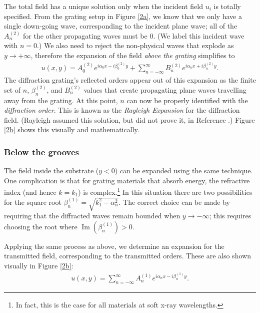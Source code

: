 The total field has a unique solution only when the incident field $u_i$ is totally specified.  From the grating setup in Figure \ref{2a}, we know that we only have a single down-going wave, corresponding to the incident plane wave; all of the $A^{(2)}_n$ for the other propagating waves must be 0.  (We label this incident wave with $n=0$.)  We also need to reject the non-physical waves that explode as $y \rightarrow +\infty$, therefore the expansion of the field \emph{above the grating} simplifies to
\begin{align}
u(x,y) =  A^{(2)}_0 e^{i \alpha_0 x - i \beta^{(2)}_0 y} +  \sum_{n=-\infty}^{\infty} B^{(2)}_n e^{i \alpha_n x + i \beta^{(2)}_n y}.
\label{rayleighExp2}
\end{align}
The diffraction grating's reflected orders appear out of this expansion as the finite set of $n$, $\beta^{(2)}_n$, and $B^{(2)}_n$ values that create propagating plane waves travelling away from the grating.  At this point, $n$ can now be properly identified with the \emph{diffraction order}.  This is known as the \emph{Rayleigh Expansion} for the diffraction field.  (Rayleigh assumed this solution, but did not prove it, in Reference \cite{Ray07}.)  Figure \ref{2b} shows this visually and mathematically. 

\subsubsection{Below the grooves}
The field inside the substrate ($y<0$) can be expanded using the same  technique.  One complication is that for grating materials that absorb energy, the refractive index (and hence $k=k_1$) is complex.\footnote{In fact, this is the case for all materials at soft x-ray wavelengths.}  In this situation there are two possibilities for the square root $\beta^{(1)}_n = \sqrt{k_1^2-\alpha_n^2}$.  The correct choice can be made by requiring that the diffracted waves remain bounded when $y\rightarrow -\infty$; this requires choosing the root where $\operatorname{Im}(\beta^{(1)}_n) > 0$.

Applying the same process as above, we determine an expansion for the transmitted field, corresponding to the transmitted orders.  These are also shown visually in Figure \ref{2b}:
\begin{align}
u(x,y) =  \sum_{n=-\infty}^{\infty} A^{(1)}_{n} e^{i \alpha_n x - i \beta^{(1)}_{n} y}.
\label{rayleighExp1}
\end{align}

